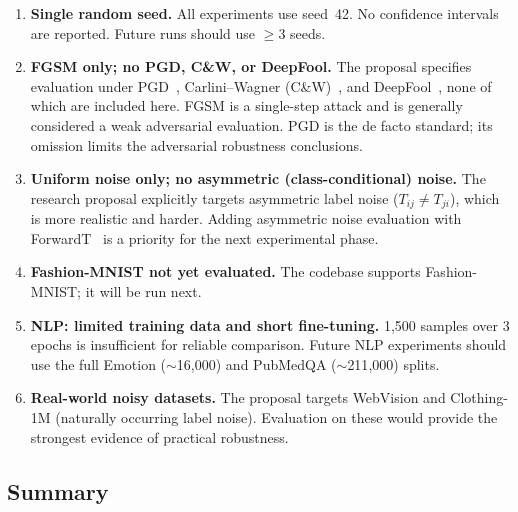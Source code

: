 \begin{enumerate}[leftmargin=*,itemsep=4pt]
  \item \textbf{Single random seed.}
        All experiments use seed~42.
        No confidence intervals are reported.
        Future runs should use $\geq 3$ seeds.

  \item \textbf{FGSM only; no PGD, C\&W, or DeepFool.}
        The proposal specifies evaluation under PGD~\citep{madry2018},
        Carlini--Wagner (C\&W)~\citep{carlini2017}, and
        DeepFool~\citep{moosavi2016}, none of which are included here.
        FGSM is a single-step attack and is generally considered a weak
        adversarial evaluation.
        PGD is the de facto standard; its omission limits the adversarial
        robustness conclusions.

  \item \textbf{Uniform noise only; no asymmetric (class-conditional) noise.}
        The research proposal explicitly targets asymmetric label noise
        ($T_{ij} \neq T_{ji}$), which is more realistic and harder.
        Adding asymmetric noise evaluation with ForwardT~\citep{patrini2017}
        is a priority for the next experimental phase.

  \item \textbf{Fashion-MNIST not yet evaluated.}
        The codebase supports Fashion-MNIST; it will be run next.

  \item \textbf{NLP: limited training data and short fine-tuning.}
        1{,}500 samples over 3 epochs is insufficient for reliable comparison.
        Future NLP experiments should use the full Emotion ($\sim$16{,}000)
        and PubMedQA ($\sim$211{,}000) splits.

  \item \textbf{Real-world noisy datasets.}
        The proposal targets WebVision and Clothing-1M (naturally occurring
        label noise). Evaluation on these would provide the strongest
        evidence of practical robustness.
\end{enumerate}

\subsection{Summary}
\label{sec:exp_summary}

